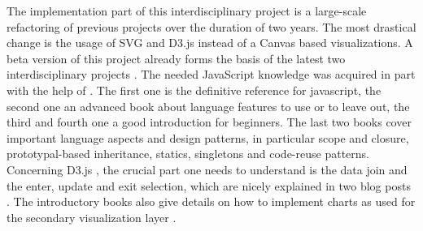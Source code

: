 The implementation part of this interdisciplinary project is a large-scale refactoring of previous projects \cite{storz2013idp,velden2014idp,sefidgar2015idp,becker2015idp,zoennchen2015idp} over the duration of two years. The most drastical change is the usage of SVG and D3.js instead of a Canvas based visualizations. A beta version of this project already forms the basis of the latest two interdisciplinary projects \cite{fischer2016idp,feil2016idp}.
The needed JavaScript knowledge was acquired in part with the help of \cite{flanagan2011javascript,crockford2008javascript,haverbeke2015eloquent,resig2013secrets,herman2012effective,stefanov2010javascript}. The first one is the definitive reference for javascript, the second one an advanced book about language features to use or to leave out, the third and fourth one a good introduction for beginners. The last two books cover important language aspects and design patterns, in particular scope and closure, prototypal-based inheritance, statics, singletons and code-reuse patterns.
Concerning D3.js \cite{bostock2011d3}, the crucial part one needs to understand is the data join and the enter, update and exit selection, which are nicely explained in two blog posts \cite{bostock2012join,bostock2016general}. The introductory books \cite{murray2013interactive,zhu2013data,meeks2015d3} also give details on how to implement charts as used for the secondary visualization layer .


